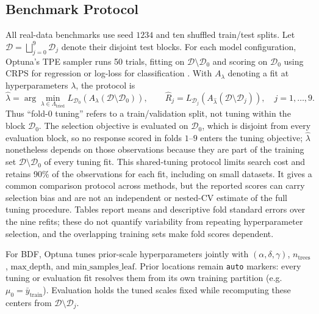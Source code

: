 \subsection{Benchmark Protocol}\label{app:benchmark-protocol}
All real-data benchmarks use seed $1234$ and ten shuffled train/test splits. Let $\mathcal D=\bigsqcup_{j=0}^{9}\mathcal D_j$ denote their disjoint test blocks. For each model configuration, Optuna's TPE sampler \citep{akiba2019optuna} runs 50 trials, fitting on $\mathcal D\setminus\mathcal D_0$ and scoring on $\mathcal D_0$ using CRPS for regression or log-loss for classification \citep{gneiting2007strictly}. With $A_\lambda$ denoting a fit at hyperparameters $\lambda$, the protocol is
\[
\hat\lambda=\arg\min_{\lambda\in\Lambda_{\mathrm{tried}}}
L_{\mathcal D_0}\!\left(A_\lambda(\mathcal D\setminus\mathcal D_0)\right),
\qquad
\widehat R_j=L_{\mathcal D_j}\!\left(A_{\hat\lambda}(\mathcal D\setminus\mathcal D_j)\right),
\quad j=1,\ldots,9.
\]
Thus ``fold-0 tuning'' refers to a train/validation split, not tuning within the block $\mathcal D_0$. The selection objective is evaluated on $\mathcal D_0$, which is disjoint from every evaluation block, so no response scored in folds $1$--$9$ enters the tuning objective; $\hat\lambda$ nonetheless depends on those observations because they are part of the training set $\mathcal D\setminus\mathcal D_0$ of every tuning fit. This shared-tuning protocol limits search cost and retains 90\% of the observations for each fit, including on small datasets. It gives a common comparison protocol across methods, but the reported scores can carry selection bias and are not an independent or nested-CV estimate of the full tuning procedure. Tables report means and descriptive fold standard errors over the nine refits; these do not quantify variability from repeating hyperparameter selection, and the overlapping training sets make fold scores dependent.

For BDF, Optuna tunes prior-scale hyperparameters jointly with $(\alpha,\delta,\gamma)$, $n_{\text{trees}}$, $\text{max\_depth}$, and $\text{min\_samples\_leaf}$. Prior locations remain \texttt{auto} markers: every tuning or evaluation fit resolves them from its own training partition (e.g.~$\mu_0=\bar y_{\mathrm{train}}$). Evaluation holds the tuned scales fixed while recomputing these centers from $\mathcal D\setminus\mathcal D_j$.

